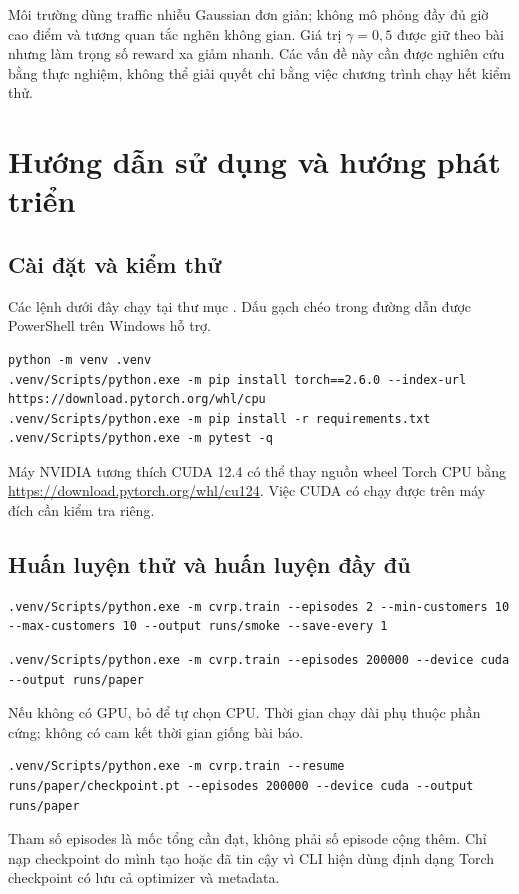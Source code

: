 \documentclass[12pt,a4paper,oneside]{report}
\newcommand{\file}[1]{\texttt{\detokenize{#1}}}
\begin{document}
Môi trường dùng traffic nhiễu Gaussian đơn giản; không mô phỏng đầy đủ
giờ cao điểm và tương quan tắc nghẽn không gian. Giá trị $\gamma=0{,}5$
được giữ theo bài nhưng làm trọng số reward xa giảm nhanh. Các vấn đề
này cần được nghiên cứu bằng thực nghiệm, không thể giải quyết chỉ bằng
việc chương trình chạy hết kiểm thử.

\chapter{Hướng dẫn sử dụng và hướng phát triển}
\section{Cài đặt và kiểm thử}
Các lệnh dưới đây chạy tại thư mục \file{research/cvrp_reproduction}.
Dấu gạch chéo trong đường dẫn được PowerShell trên Windows hỗ trợ.
\begin{lstlisting}[language={},caption={Tạo môi trường Python và cài thư viện trên CPU}]
python -m venv .venv
.venv/Scripts/python.exe -m pip install torch==2.6.0 --index-url https://download.pytorch.org/whl/cpu
.venv/Scripts/python.exe -m pip install -r requirements.txt
.venv/Scripts/python.exe -m pytest -q
\end{lstlisting}
Máy NVIDIA tương thích CUDA 12.4 có thể thay nguồn wheel Torch CPU bằng
\url{https://download.pytorch.org/whl/cu124}. Việc CUDA có chạy được trên
máy đích cần kiểm tra riêng.

\section{Huấn luyện thử và huấn luyện đầy đủ}
\begin{lstlisting}[language={},caption={Kiểm tra vận hành bằng hai episode}]
.venv/Scripts/python.exe -m cvrp.train --episodes 2 --min-customers 10 --max-customers 10 --output runs/smoke --save-every 1
\end{lstlisting}
\begin{lstlisting}[language={},caption={Huấn luyện theo cấu hình nghiên cứu trên GPU}]
.venv/Scripts/python.exe -m cvrp.train --episodes 200000 --device cuda --output runs/paper
\end{lstlisting}
Nếu không có GPU, bỏ \file{--device cuda} để tự chọn CPU. Thời gian
chạy dài phụ thuộc phần cứng; không có cam kết thời gian giống bài báo.

\begin{lstlisting}[language={},caption={Tiếp tục checkpoint với cùng cấu hình}]
.venv/Scripts/python.exe -m cvrp.train --resume runs/paper/checkpoint.pt --episodes 200000 --device cuda --output runs/paper
\end{lstlisting}
Tham số episodes là mốc tổng cần đạt, không phải số episode cộng thêm.
Chỉ nạp checkpoint do mình tạo hoặc đã tin cậy vì CLI hiện dùng định
dạng Torch checkpoint có lưu cả optimizer và metadata.
\end{document}
